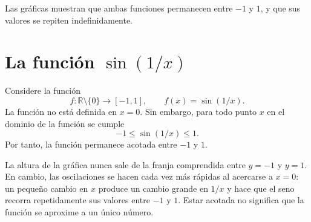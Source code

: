 \documentclass[10pt,a5paper]{article}
\begin{document}
Las gráficas muestran que ambas funciones permanecen entre $-1$ y $1$, y que sus valores se repiten indefinidamente.

\section*{La función $\sin(1/x)$}

Considere la función
\[
  f\colon\mathbb{R}\setminus\{0\}\longrightarrow[-1,1],
  \qquad
  f(x)=\sin(1/x).
\]
La función no está definida en $x=0$. Sin embargo, para todo punto $x$ en el dominio de la función se cumple
\[
  -1\leq\sin(1/x)\leq1.
\]
Por tanto, la función permanece acotada entre $-1$ y $1$.

\begin{center}
\end{center}

La altura de la gráfica nunca sale de la franja comprendida entre $y=-1$ y $y=1$. En cambio, las oscilaciones se hacen cada vez más rápidas al acercarse a $x=0$: un pequeño cambio en $x$ produce un cambio grande en $1/x$ y hace que el seno recorra repetidamente sus valores entre $-1$ y $1$. Estar acotada no significa que la función se aproxime a un único número.

\end{document}
